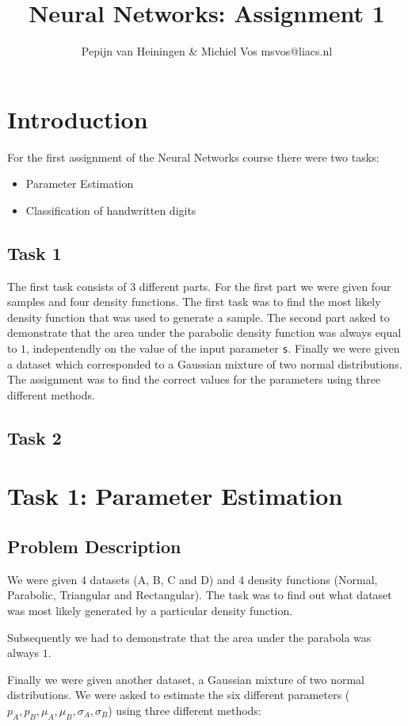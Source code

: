 \documentclass{article}
\title{Neural Networks: Assignment 1}
\author{Pepijn van Heiningen \& Michiel Vos msvos@liacs.nl}
\begin{document}
\maketitle

\section{Introduction}
For the first assignment of the Neural Networks course there were two tasks:
\begin{itemize}
\item Parameter Estimation
\item Classification of handwritten digits
\end{itemize}

\subsection{Task 1}
The first task consists of $3$ different parts. For the first part we were given four samples and four density functions. The first task was to find the most likely density function that was used to generate a sample. 
The second part asked to demonstrate that the area under the parabolic density function was always equal to $1$, indepentendly on the value of the input parameter \verb+s+.
Finally we were given a dataset which corresponded to a Gaussian mixture of two normal distributions. The assignment was to find the correct values for the parameters using three different methods.

\subsection{Task 2}

\section{Task 1: Parameter Estimation}
\subsection{Problem Description}
We were given 4 datasets (A, B, C and D) and 4 density functions (Normal, Parabolic, Triangular and Rectangular). The task was to find out what dataset was most likely generated by a particular density function. 

Subsequently we had to demonstrate that the area under the parabola was always $1$.

Finally we were given another dataset, a Gaussian mixture of two normal distributions. We were asked to estimate the six different parameters ($p_A, p_B, \mu_A, \mu_B, \sigma_A, \sigma_B$) using three different methods:
\end{document}
